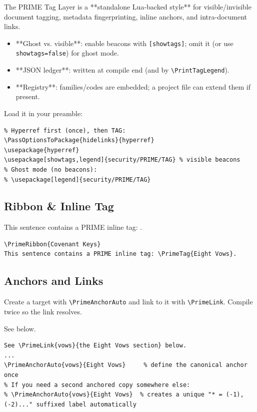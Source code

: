 \documentclass[11pt]{article}
\begin{document}
The PRIME Tag Layer is a **standalone Lua-backed style** for visible/invisible
document tagging, metadata fingerprinting, inline anchors, and intra-document links.

\begin{itemize}
  \item **Ghost vs. visible**: enable beacons with \verb|[showtags]|; omit it (or use \verb|showtags=false|) for ghost mode.
  \item **JSON ledger**: written at compile end (and by \verb|\PrintTagLegend|).
  \item **Registry**: families/codes are embedded; a project file can extend them if present.
\end{itemize}

Load it in your preamble:

\begin{lstlisting}
% Hyperref first (once), then TAG:
\PassOptionsToPackage{hidelinks}{hyperref}
\usepackage{hyperref}
\usepackage[showtags,legend]{security/PRIME/TAG} % visible beacons
% Ghost mode (no beacons):
% \usepackage[legend]{security/PRIME/TAG}
\end{lstlisting}

\subsection*{Ribbon \& Inline Tag}
This sentence contains a PRIME inline tag: .

\begin{lstlisting}
\PrimeRibbon{Covenant Keys}
This sentence contains a PRIME inline tag: \PrimeTag{Eight Vows}.
\end{lstlisting}

\subsection*{Anchors and Links}
Create a target with \verb|\PrimeAnchorAuto| and link to it with \verb|\PrimeLink|.
Compile twice so the link resolves.

See  below.

\begin{lstlisting}
See \PrimeLink{vows}{the Eight Vows section} below.
...
\PrimeAnchorAuto{vows}{Eight Vows}     % define the canonical anchor once
% If you need a second anchored copy somewhere else:
% \PrimeAnchorAuto{vows}{Eight Vows}  % creates a unique "* = (-1), (-2)..." suffixed label automatically
\end{lstlisting}
\end{document}
